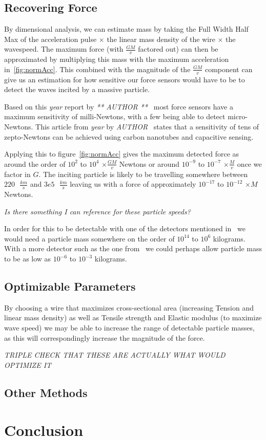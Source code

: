 \documentclass{report}
\begin{document}
\section*{Recovering Force}
By dimensional analysis, we can estimate mass by taking the Full Width Half Max of the acceleration pulse $\times$ the linear mass density of the wire $\times$ the wavespeed.
The maximum force (with $\frac{G M}{v}$ factored out) can then be approximated by multiplying this mass with the maximum acceleration in~\ref{fig:normAcc}. This combined with 
the magnitude of the $\frac{G M}{v}$ component can give us an estimation for how sensitive our force sensors would have to be to detect the waves incited by a massive particle.

Based on this \emph{year} report by \emph{** AUTHOR **}~\cite{WEI2015359} most force sensors have a maximum sensitivity of milli-Newtons, with a few being able to detect micro-Newtons.
This article from \emph{year} by \emph{AUTHOR}~\cite{Moser2013} states that a sensitivity of tens of zepto-Newtons can be achieved using carbon nanotubes and capacitive sensing. 

Applying this to figure~\ref*{fig:normAcc} gives the maximum detected force as around the order of $10^2$ to $10^4$ $\times \frac{G M}{v}$ Newtons or around $10^{-9}$ to $10^{-7}$ $\times \frac{M}{v}$ once we factor in $G$. 
The inciting particle is likely to be travelling somewhere between $220 \text{ } \frac{km}{s}$ and $3e5 \text{ } \frac{km}{s}$ leaving us with a force of approximately $10^{-17}$ to $10^{-12}$ $\times M$ Newtons.

\emph{Is there something I can reference for these particle speeds?}

In order for this to be detectable with one of the detectors mentioned in~\cite{WEI2015359} we would need a particle mass somewhere on the order of $10^{14}$ to $10^{6}$ kilograms. 
With a more detector such as the one from~\cite{Moser2013} we could perhaps allow particle mass to be as low as $10^{-6}$ to $10^{-3}$ kilograms. 
\section*{Optimizable Parameters}
By choosing a wire that maximizes cross-sectional area (increasing Tension and linear mass density) as well as Tensile strength and Elastic modulus (to maximize wave speed) we may be able to increase the range of detectable 
particle masses, as this will correspondingly increase the magnitude of the force.

\emph{TRIPLE CHECK THAT THESE ARE ACTUALLY WHAT WOULD OPTIMIZE IT}
\section*{Other Methods}
\chapter*{Conclusion}
\printbibliography[]
\end{document}

